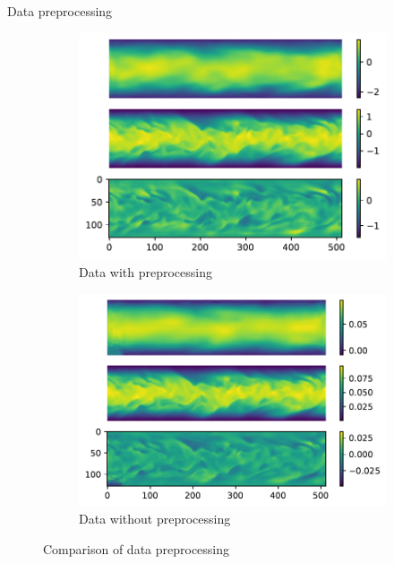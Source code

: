\documentclass{beamer}
\begin{document}
\begin{frame}{Data preprocessing}
\begin{figure}[ht]
	\centering
	\begin{subfigure}{0.5\linewidth} %
		\centering
		\includegraphics[width=\linewidth]{fig/ED-std.pdf}
		\caption{Data with preprocessing}
	  \end{subfigure}%
	  \begin{subfigure}{0.5\linewidth} %
		\centering
		\includegraphics[width=\linewidth]{fig/ED.pdf}
		\caption{Data without preprocessing}
	  \end{subfigure}
	  \caption{Comparison of data preprocessing}
\end{figure}
\end{frame}
\end{document}
